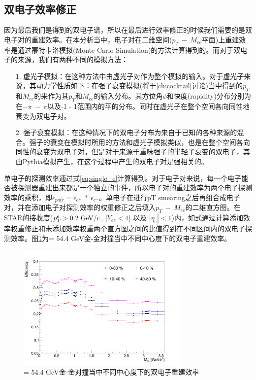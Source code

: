 \subsection{双电子效率修正}
\label{chap:pair_eff}

因为最后我们是得到的双电子谱，所以在最后进行效率修正的时候我们需要的是双电子对的重建效率。在本分析当中，电子对在二维空间($p_T~-~M_{ee}$平面)上重建效率是通过蒙特卡洛模拟(Monte Carlo Simulation)的方法计算得到的。而对于双电子的来源，我们有两种不同的模拟方法：
\begin{itemize}
    \item[1.]虚光子模拟：在这种方法中由虚光子对作为整个模拟的输入。对于虚光子来说，其动力学性质如下：在强子衰变模拟(将于\ref{ch:cocktail}讨论)当中得到的$p_T$和$M_{ee}$的来作为其$p_T$和$M_{ee}$的输入分布。其方位角$\phi$和快度(rapidity)分布分别为在$-\pi~-~\pi$以及-1 - 1范围内的平的分布。同时在虚光子在整个空间各向同性地衰变为双电子对。
    \item[2.]强子衰变模拟：在这种情况下的双电子分布为来自于已知的各种来源的混合。强子的衰变在模拟时所用的方法和虚光子模拟类似，也是在整个空间各向同性的衰变为双电子对，但是对于来源于重味强子的半轻子衰变的双电子，其由Pythia模拟产生，在这个过程中产生的双电子对是强相关的。
\end{itemize}
单电子的探测效率通过式\ref{eq:single_e}计算得到。对于电子对来说，每一个电子能否被探测器重建出来都是一个独立的事件，所以电子对的重建效率为两个电子探测效率的乘积，即$\epsilon_{pair} = \epsilon_{e^+}~*~\epsilon_{e^-}$。单电子在进行pT smearing之后再组合成电子对，并在添加电子对探测效率的权重修正之后填入$p_T~-~M_{ee}$的二维直方图。在STAR的接收度($p_T^{e} > 0.2~{\rm GeV/c}$, $|Y_{ee} < 1|$ 以及 $|\eta_e| < 1$)内，如式通过计算添加效率权重修正和未添加效率权重两个直方图之间的比值得到在不同区间内的双电子探测效率。图\ref{fig:Compare_PairEff}为\sNN = 54.4 GeV金-金对撞当中不同中心度下的双电子重建效率。

\begin{figure}[htb]
    \begin{center}
    \includegraphics[width=0.75\textwidth,clip]{figures/Chapter4/Compare_PairEff.png}
    \end{center}
    \caption[不同中心度下的双电子重建效率]{\sNN = 54.4 GeV金-金对撞当中不同中心度下的双电子重建效率}
    \label{fig:Compare_PairEff}
\end{figure}

